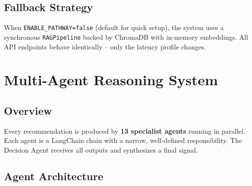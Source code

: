 \documentclass[11pt, a4paper]{article}
\begin{document}
\subsection{Fallback Strategy}

When \texttt{ENABLE\_PATHWAY=false} (default for quick setup), the system uses a
synchronous \texttt{RAGPipeline} backed by ChromaDB with in-memory embeddings.
All API endpoints behave identically -- only the latency profile changes.

\section{Multi-Agent Reasoning System}

\subsection{Overview}

Every recommendation is produced by \textbf{13 specialist agents} running in parallel.
Each agent is a LangChain chain with a narrow, well-defined responsibility.
The Decision Agent receives all outputs and synthesizes a final signal.

\subsection{Agent Architecture}
\end{document}

